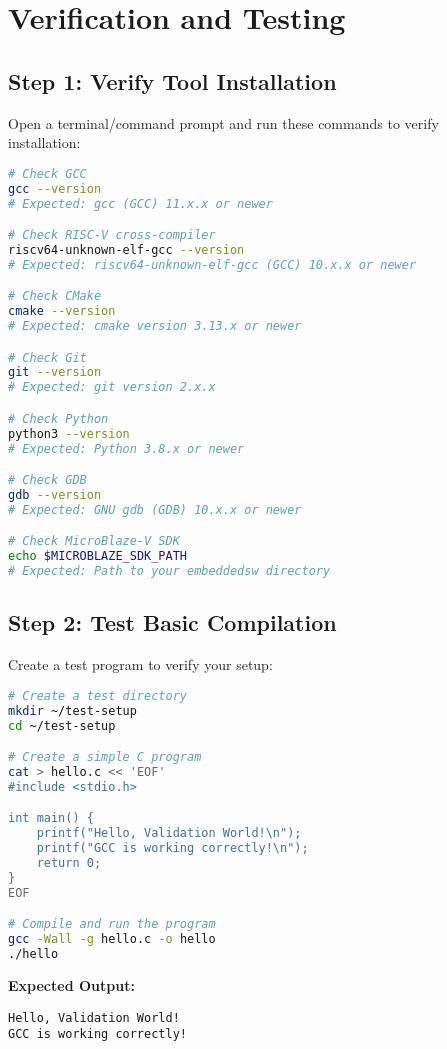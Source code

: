 \documentclass[11pt,a4paper]{article}
\begin{document}
\section{Verification and Testing}

\subsection{Step 1: Verify Tool Installation}
Open a terminal/command prompt and run these commands to verify installation:

\begin{lstlisting}[language=bash]
# Check GCC
gcc --version
# Expected: gcc (GCC) 11.x.x or newer

# Check RISC-V cross-compiler
riscv64-unknown-elf-gcc --version
# Expected: riscv64-unknown-elf-gcc (GCC) 10.x.x or newer

# Check CMake
cmake --version
# Expected: cmake version 3.13.x or newer

# Check Git
git --version
# Expected: git version 2.x.x

# Check Python
python3 --version
# Expected: Python 3.8.x or newer

# Check GDB
gdb --version
# Expected: GNU gdb (GDB) 10.x.x or newer

# Check MicroBlaze-V SDK
echo $MICROBLAZE_SDK_PATH
# Expected: Path to your embeddedsw directory
\end{lstlisting}

\subsection{Step 2: Test Basic Compilation}
Create a test program to verify your setup:

\begin{lstlisting}[language=bash]
# Create a test directory
mkdir ~/test-setup
cd ~/test-setup

# Create a simple C program
cat > hello.c << 'EOF'
#include <stdio.h>

int main() {
    printf("Hello, Validation World!\n");
    printf("GCC is working correctly!\n");
    return 0;
}
EOF

# Compile and run the program
gcc -Wall -g hello.c -o hello
./hello
\end{lstlisting}

\textbf{Expected Output:}
\begin{verbatim}
Hello, Validation World!
GCC is working correctly!
\end{verbatim}
\end{document}
